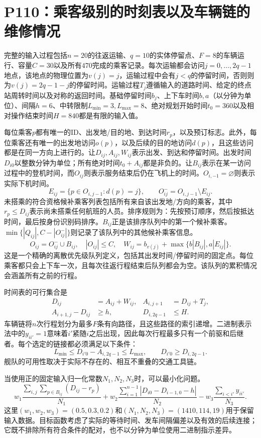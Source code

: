 \documentclass[11pt]{article}
\begin{document}
\section*{P110：乘客级别的时刻表以及车辆链的维修情况}
完整的输入过程包括$n=20$的往返运输、$q=10$的实体停留点、$F=8$的车辆运行、容量$C=30$以及所有$470$完成的乘客记录。每次运输都会访问$j=0,\ldots,2q-1$地点，该地点的物理位置为$v(j)=j$，运输过程中会有$j<q$的停留时间，否则则为$v(j)=2q-1-j$的停留时间。运输过程$T_j$遵循输入的道路时间、给定的终点站周转时间以及对称的返回时间。基础停留时间$b_j$、上下车时间$b,a$（以分钟为单位）、间隔$h=6$、中转限制$L_{\min}=3,L_{\max}=8$、绝对规划开始时间$t_0=360$以及相对操作结束时间$H=840$都是有限的输入值。

每位乘客$p$都有唯一的ID、出发地/目的地、到达时间$r_p$，以及预订标志。此外，每位乘客还有唯一的出发地访问$o(p)$，以及后续的目的地访问$d(p)$，且这些访问都是在同一方向上进行的。让$D_{ij},A_{ij},W_{ij}$表示出发、到达和停留时间。出发时间$D_{i0}$以整数分钟为单位；所有绝对时间$t_0+A_{ij}$都是非负的。让$B_{ij}$表示在某一访问过程中的登机时间，而$O_{ij}$则表示服务结束后仍在飞机上的时间。$O_{i,-1}=\varnothing$则表示实际下机时间。
\[
E_{ij}=\{p\in O_{i,j-1}:d(p)=j\},\qquad
O^-_{ij}=O_{i,j-1}\setminus E_{ij}.
\]
未搭乘的符合资格候补乘客列表包括所有来自该出发地/方向的乘客，其中$r_p\le D_{ij}$表示尚未搭乘任何航班的人员。排序规则为：先按预订顺序，然后按抵达时间，最后按身份识别码排序。$B_{ij}$正是该排序队列中的第一个候补乘客。$\min\{|Q_{ij}|,C-|O^-_{ij}|\}$则记录了该队列中的其他候补乘客信息。
\[
O_{ij}=O^-_{ij}\cup B_{ij},\quad |O_{ij}|\le C,\quad
W_{ij}=b_{v(j)}+\max\{b|B_{ij}|,a|E_{ij}|\}.
\]
这是一个精确的离散优先级队列定义，包括其出发时间/停留时间的固定点。每位乘客都只会上下车一次，且每次往返行程结束后队列都会为空。该队列的累积情况会涵盖所有之前的行程。

时间表的可行集合是
\begin{align}
D_{ij}&=A_{ij}+W_{ij},&
A_{i,j+1}&=D_{ij}+T_j,\\
A_{i+1,j}-D_{ij}&\ge h,&
D_{i,2q-1}&\le H.
\end{align}
车辆链将$n$次行程划分为最多$F$条有向路径，且这些路径的索引递增。二进制表示法中的$y_{ii'}=1$意味着$i'$紧随$i$之后出现，因此每次行程最多只有一个前驱和后继者。每个选定的链接都必须满足以下条件：
\[
L_{\min}\le D_{i'0}-A_{i,2q-1}\le L_{\max},\qquad
D_{i'0}\ge D_{i,2q-1}.
\]
舰队的可用性取决于实际不存在的、相互不重叠的交通工具链。

当使用正的固定输入归一化常数$N_1,N_2,N_3$时，可以最小化问题。
\[
 w_1\frac{\sum_{i,j}\sum_{p\in B_{ij}}(D_{ij}-r_p)}{N_1}
 +w_2\frac{\sum_{i=1}^{n-1}|D_{i0}-D_{i-1,0}-h|}{N_2}
 -w_3\frac{\sum_{i<i'}y_{ii'}}{N_3}.
\]
这里$(w_1,w_2,w_3)=(0.5,0.3,0.2)$和$(N_1,N_2,N_3)=(1410,114,19)$用于保留输入数据。目标函数考虑了实际的等待时间、发车间隔偏差以及有效的后续连接；它既不排除所有符合条件的配对，也不以分钟为单位使用二进制指示差异。
\end{document}
